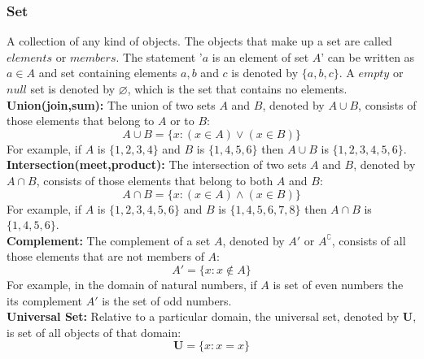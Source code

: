 \documentclass[twocolumn, 10pt]{article}
\begin{document}
\subsubsection{Set}
 A collection of any kind of objects. The objects that make  up a set are called $elements$ or $members$. The statement '$a$ is an element of set $A$' can be written as $a \in A$ and set containing elements $a,b$ and $c$ is denoted by $\{a,b,c\}$. A $empty$  or $null$ set is denoted by  $\varnothing$, which is the set that contains no elements.\\
\textbf{Union(join,sum):} The union of two sets $A$ and $B$, denoted by $A \cup B$, consists of those elements that belong to $A$ or to $B$: $$A \cup B = \{x:(x \in A) \lor (x \in B)\}$$ For example, if $A$ is $\{1,2,3,4\}$ and $B$ is $\{1,4,5,6\}$ then $A \cup B$  is $\{1,2,3,4,5,6\}$.\\
\textbf{Intersection(meet,product):} The intersection of two sets $A$ and $B$, denoted by $A \cap B$, consists of those elements that belong to both $A$ and $B$: $$A \cap B=\{x:(x \in A) \land (x \in B)\}$$ For example, if $A$ is $\{1,2,3,4,5,6\}$ and $B$ is $\{1,4,5,6,7,8\}$ then $A \cap B$ is $\{1,4,5,6\}$.\\
\textbf{Complement:} The complement of a set $A$, denoted by $A'$ or $A^{\complement}$, consists of all those elements that are not members of $A$: $$A'=\{x:x \not \in A\}$$ For example, in the domain of natural numbers, if $A$ is set of even numbers the its complement $A'$ is the set of odd numbers.\\
\textbf{Universal Set:} Relative to a particular domain, the universal set, denoted by $\mathbf{U}$, is set of all objects of that domain:
$$\mathbf{U}=\{x:x=x\}$$
\end{document}
